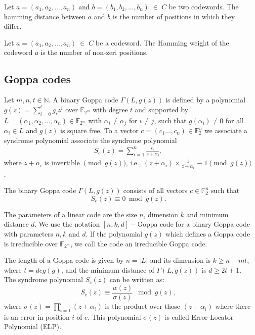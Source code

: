 \begin{definition}
Let $a = (a_1, a_2, \dots, a_n)$ and $b = (b_1, b_2, \dots, b_n) \; \in \; C$ be two codewords. The hamming distance between $a$ and $b$ is the number of positions in which they differ.
\end{definition}

\begin{definition}
Let $a = (a_1, a_2, \dots, a_n) \; \in \; C$ be a codeword. The Hamming weight of the codeword $a$ is the number of non-zeri positions.
\end{definition}


\subsection{Goppa codes}
Let $m, n, t\in \mathbb{N}$. A binary Goppa code $\Gamma(L, g(z))$ is defined by a polynomial $g(z) = \sum_{i=0}^{t}g_iz^i$ over $\mathbb{F}_{2^m}$ with degree $t$ and supported by $L = (\alpha_1, \alpha_2, \dots, \alpha_n) \in \mathbb{F}_{2^m}$ with $\alpha_i \neq \alpha_j$ for $i\neq j$, such that $g(\alpha_i) \neq 0$ for all $\alpha_i \in L$ and $g(z)$ is square free. To a vector  $c = (c_1 \ldots, c_{n}) \in \mathbb{F}^n_{2}$ we associate a syndrome polynomial associate the syndrome polynomial
\begin{align}
  S_c(z) = \sum_{i=1}^{n} \frac{c_i}{z+\alpha_i},  
\end{align}
where ${z+\alpha_i}$ is invertible $\pmod{g(z)}$, i.e., $(z+\alpha_i) \times \frac{1}{z+\alpha_i} \equiv 1 \pmod{g(z)}$.
\begin{definition}
The binary Goppa code $\Gamma(L, g(z))$ consists of all vectors $c \in \mathbb{F}_{2}^n$ such that
\begin{equation}
    S_c(z) \equiv 0 \bmod{g(z)}.
\end{equation}
\end{definition}

The parameters of a linear code are the size $n$, dimension $k$ and minimum distance $d$. We use the notation $[n,k,d]-$Goppa code for a binary Goppa code with parameters $n,k$ and $d$. If the polynomial $g(z)$ which defines a Goppa code is irreducible over $\mathbb{F}_{2^m}$, we call the code an irreducible Goppa code.

The length of a Goppa code is given by $n = |L|$ and its dimension is $k \geq n-mt$, where $t = deg(g)$, and the minimum distance of $\Gamma(L, g(z))$ is $d \geq 2t + 1$. The syndrome polynomial $S_c(z)$ can be written as:
\begin{equation}
    S_c(z) \equiv \frac{w(z)}{\sigma(z)} \mod g(z),
\end{equation}
where $\sigma(z) = {\displaystyle \prod_{i=1}^{l}(z+\alpha_i)}$ is the product over those $(z+\alpha_i)$ where there is an error in position $i$ of $c$. This polynomial $\sigma(z)$ is called Error-Locator Polynomial (ELP).

